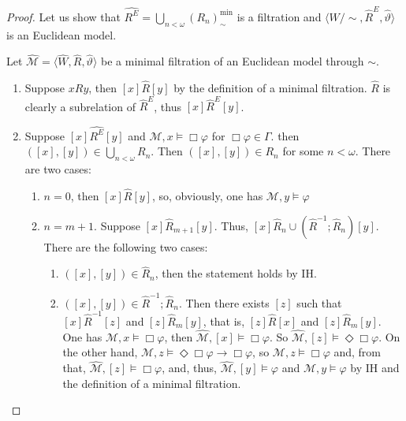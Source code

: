 \documentclass[a4paper]{article}
\theoremstyle{defin}
\theoremstyle{theorem}
\theoremstyle{prop}
\theoremstyle{lemma}
\theoremstyle{ex}
\theoremstyle{col}
\begin{document}
\begin{proof}
  Let us show that $\widehat{R^{E}} = \bigcup \limits_{n < \omega} (R_n)^{\text{min}}_{\sim}$ is a filtration and $\langle W / \sim, \widehat{R}^{E}, \widehat{\vartheta} \rangle$ is an Euclidean model.

  Let $\widehat{\mathcal{M}} = \langle \widehat{W}, \widehat{R}, \widehat{\vartheta} \rangle$ be a minimal filtration of an Euclidean model through $\sim$.

  \begin{enumerate}
    \item Suppose $x R y$, then $[x] \widehat{R} [y]$ by the definition of a minimal filtration. $\widehat{R}$ is clearly a subrelation of $\widehat{R}^{E}$, thus $[x] \widehat{R}^{E} [y]$.
    \item Suppose $[x] \widehat{R^{E}} [y]$ and $\mathcal{M}, x \models \Box \varphi$ for $\Box \varphi \in \Gamma$. then $([x], [y]) \in \bigcup \limits_{n < \omega} R_n$. Then $([x], [y]) \in R_n$ for some $n < \omega$.
    There are two cases:
    \begin{enumerate}
      \item $n = 0$, then $[x] \widehat{R} [y]$, so, obviously, one has $\mathcal{M}, y \models \varphi$
      \item $n = m + 1$. Suppose $[x] {\widehat{R}}_{m + 1} [y]$. Thus, $[x] \widehat{R}_n \cup (\widehat{R}^{-1} ; \widehat{R}_n) [y]$.
      There are the following two cases:
      \begin{enumerate}
        \item $([x], [y]) \in \widehat{R}_n$, then the statement holds by IH.
        \item $([x], [y]) \in \widehat{R}^{-1} ; \widehat{R}_n$.
        Then there exists $[z]$ such that $[x] \widehat{R}^{-1} [z]$ and $[z] \widehat{R}_m [y]$, that is,
        $[z] \widehat{R} [x]$ and $[z] \widehat{R}_m [y]$. One has $\mathcal{M}, x \models \Box \varphi$, then
        $\widehat{\mathcal{M}}, [x] \models \Box \varphi$. So $\widehat{\mathcal{M}}, [z] \models \Diamond \Box \varphi$. On the other hand, $\mathcal{M}, z \models \Diamond \Box \varphi \to \Box \varphi$, so $\mathcal{M}, z \models \Box \varphi$ and,
        from that, $\widehat{\mathcal{M}}, [z] \models \Box \varphi$, and, thus, $\widehat{\mathcal{M}}, [y] \models \varphi$ and $\mathcal{M}, y \models \varphi$ by IH and the definition of a minimal filtration.
      \end{enumerate}
    \end{enumerate}
  \end{enumerate}
\end{proof}
\end{document}
